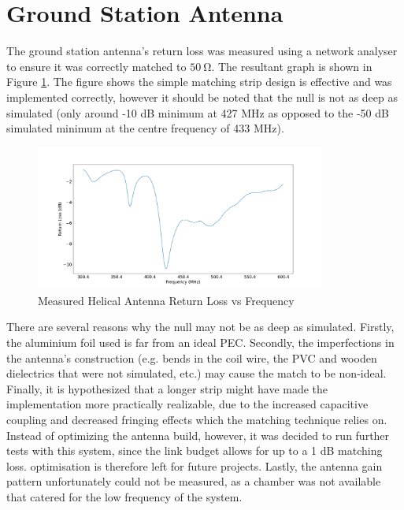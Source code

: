 \graphicspath{{./figures}}

\section{Ground Station Antenna}

The ground station antenna's return loss was measured using a network analyser to ensure it was correctly matched to $\SI{50}{\ohm}$. The resultant graph is shown in Figure \ref{fig:helicalReturnLoss}. The figure shows the simple matching strip design is effective and was implemented correctly, however it should be noted that the null is not as deep as simulated (only around -10 dB minimum at 427 MHz as opposed to the -50 dB simulated minimum at the centre frequency of 433 MHz).

\begin{figure}[!htb]
  \centering
  \includegraphics[width=0.85\textwidth]{helicalReturnLoss}
  \caption{Measured Helical Antenna Return Loss vs Frequency}
  \label{fig:helicalReturnLoss}
\end{figure}

There are several reasons why the null may not be as deep as simulated. Firstly, the aluminium foil used is far from an ideal PEC. Secondly, the imperfections in the antenna's construction (e.g. bends in the coil wire, the PVC and wooden dielectrics that were not simulated, etc.) may cause the match to be non-ideal. Finally, it is hypothesized that a longer strip might have made the implementation more practically realizable, due to the increased capacitive coupling and decreased fringing effects which the matching technique relies on. Instead of optimizing the antenna build, however, it was decided to run further tests with this system, since the link budget allows for up to a 1 dB matching loss. optimisation is therefore left for future projects. Lastly, the antenna gain pattern unfortunately could not be measured, as a chamber was not available that catered for the low frequency of the system.